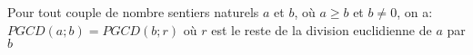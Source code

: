 
Pour tout couple de nombre sentiers naturels $a$ et $b$, où $a \geq b$ et $b \neq 0$, on a: \\
$PGCD(a;b)=PGCD(b;r)$ où $r$ est le reste de la division euclidienne de $a$ par $b$
